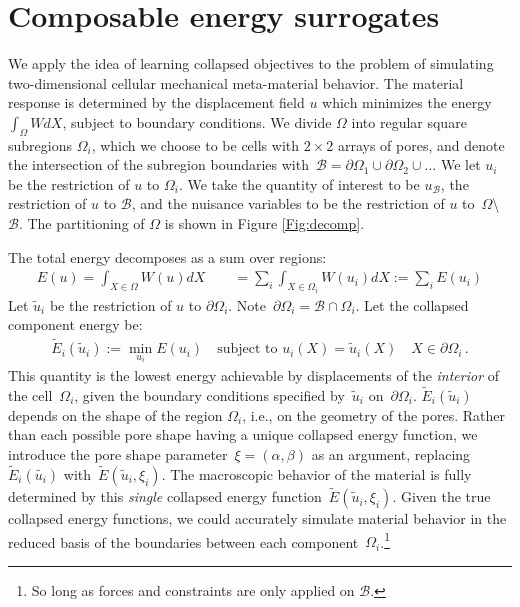 \section{Composable energy surrogates}
\label{sec:surrogates}
We apply the idea of learning collapsed objectives to the problem of simulating two-dimensional cellular mechanical meta-material behavior.
The material response is determined by the displacement field $u$ which minimizes the energy~${\int_{\Omega} W dX}$, subject to boundary conditions.
We divide $\Omega$ into regular square subregions $\Omega_i$, which we choose to be cells with $2\times2$ arrays of pores, and denote the intersection of the subregion boundaries with~${\mathcal{B} = \partial\Omega_1 \cup \partial\Omega_2 \cup} \dots$
We let $u_i$ be the restriction of $u$ to $\Omega_i$.
We take the quantity of interest to be $u_{\mathcal{B}}$, the restriction of $u$ to $\mathcal{B}$, and the nuisance variables to be the restriction of $u$ to~${\Omega}$\textbackslash~${\mathcal{B}}$.
The partitioning of $\Omega$ is shown in Figure \ref{Fig:decomp}.

The total energy decomposes as a sum over regions:
\begin{align*}
    E(u) = \int_{X \in \Omega} W(u) dX \quad \quad = \sum_i \int_{X \in \Omega_i} W(u_i) dX := \sum_i E(u_i)
\end{align*}\vspace{-0.1cm}
Let $\tilde{u}_i$ be the restriction of $u$ to $\partial\Omega_i$. Note~${\partial\Omega_i = \mathcal{B} \cap \Omega_i}$.
Let the collapsed component energy be:
\begin{align*}
    \tilde{E}_i (\tilde{u}_i) := \min_{u_i} E (u_i) \quad \text{subject to } u_i(X) = \tilde{u}_i(X)\quad X \in \partial{\Omega_i}\,.
\end{align*}
This quantity is the lowest energy achievable by displacements of the \emph{interior} of the cell~$\Omega_i$, given the boundary conditions specified by~$\tilde{u}_i$ on~$\partial{\Omega_i}$.
$\tilde{E}_i(\tilde{u}_i)$ depends on the shape of the region $\Omega_i$, i.e., on the geometry of the pores.
Rather than each possible pore shape having a unique collapsed energy function, we introduce the pore shape parameter~${\xi = (\alpha, \beta)}$ as an argument, replacing~$\tilde{E}_i(\tilde{u_i})$ with~$\tilde{E}(\tilde{u}_i, \xi_i)$.
The macroscopic behavior of the material is fully determined by this \emph{single} collapsed energy function~${\tilde{E}(\tilde{u}_i, \xi_i)}$.
Given the true collapsed energy functions, we could accurately simulate material behavior in the reduced basis of the boundaries between each component~$\Omega_i$.\footnote{So long as forces and constraints are only applied on $\mathcal{B}$.}

